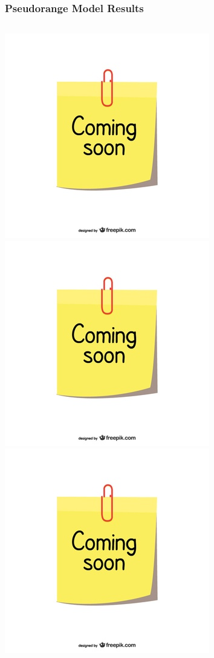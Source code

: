 \documentclass{beamer}
\begin{document}
	\begin{frame}
		\frametitle{Pseudorange Model Results}
		\begin{columns}[t]
			\centering
			\includegraphics[scale= 0.3]{coming-soon}\\
			\includegraphics[scale= 0.3]{coming-soon}
			\centering
			\includegraphics[scale= 0.3]{coming-soon}\\

\end{columns}
\end{frame}
\end{document}

